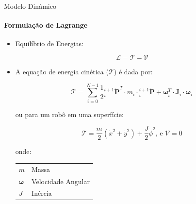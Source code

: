 \documentclass{beamer}
\begin{document}
\begin{frame}{Modelo Dinâmico}
    \framesubtitle{Formulação de Lagrange}

    \begin{itemize}

        \item Equilíbrio de Energias:

        \begin{equation}
            \mathcal{L}= \mathcal{T} - \mathcal{V}
        \end{equation}

        \item A equação de energia cinética ($\mathcal{T}$) é dada por:
        
        \begin{equation}
        \mathcal{T} = \sum\limits_{i=0}^{N-1} \frac{1}{2} {}_{i}^{i+1}\dot{\mathbf{P}}^T\cdot m_{i}\cdot {}_{i}^{i+1}\dot{\mathbf{P}}+ \mathbf{\omega}_i^T\cdot \mathbf{J}_i \cdot \mathbf{\omega}_i
    \end{equation}

        \begin{block}{ou para um robô em uma superfície:} 
       
            \begin{equation*}
                \boxed{
                \mathcal{T} = \frac{m}{2}\left(\dot{x}^2+\dot{y}^2 \right)+ \frac{J}{2}\dot{\phi}^2}
                \text{, e  }
                \boxed{\mathcal{V} = 0}
            \end{equation*}
        \scriptsize{
            onde: 
            \begin{tabular}{l|l}
                $m$ & Massa \\
                $\mathbf{\omega}$ & Velocidade Angular \\
                $J$ & Inércia \\
            \end{tabular}}
        \end{block}
    \end{itemize}
\end{frame}
\end{document}
